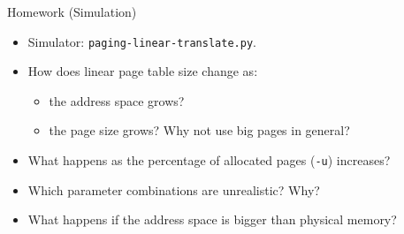 \begin{frame}{Homework (Simulation)}

\begin{itemize}
    \item Simulator: \texttt{paging-linear-translate.py}.
    \item How does linear page table size change as:
    \begin{itemize}
        \item the address space grows?
        \item the page size grows? Why not use big pages in general?
    \end{itemize}
    \item What happens as the percentage of allocated pages (\texttt{-u})
          increases?
    \item Which parameter combinations are unrealistic? Why?
    \item What happens if the address space is bigger than physical memory?
\end{itemize}

\end{frame}
